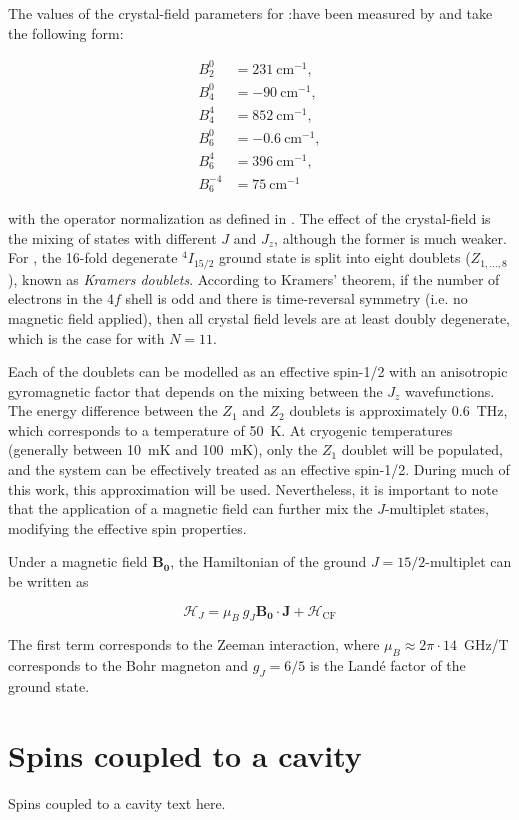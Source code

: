 The values of the crystal-field parameters for \Er:\Ca have been measured by \cite{enrique_optical_1971} and take the following form:

\begin{align*}
    B_2^0 &= 231~\text{cm}^{-1}, \\
    B_4^0 &= -90~\text{cm}^{-1}, \\
    B_4^4 &= 852~\text{cm}^{-1}, \\
    B_6^0 &= -0.6~\text{cm}^{-1}, \\
    B_6^4 &= 396~\text{cm}^{-1}, \\
    B_6^{-4} &= 75~\text{cm}^{-1}
\end{align*}

with the operator normalization as defined in \cite{erath_crystal_1961}. The effect of the crystal-field is the mixing of states with different $J$ and $J_z$, although the former is much weaker. For \Er, the 16-fold degenerate $^4I_{15/2}$ ground state is split into eight doublets ($Z_{1,\dots,8}$), known as \emph{Kramers doublets}. According to Kramers' theorem, \cite{kramers_general_1930} if the number of electrons in the $4f$ shell is odd and there is time-reversal symmetry (i.e. no magnetic field applied), then all crystal field levels are at least doubly degenerate, which is the case for \Er with $N=11$.

Each of the doublets can be modelled as an effective spin-1/2 with an anisotropic gyromagnetic factor that depends on the mixing between the $J_z$ wavefunctions. The energy difference between the $Z_1$ and $Z_2$ doublets is approximately 0.6~THz, which corresponds to a temperature of 50~K. At cryogenic temperatures (generally between 10~mK and 100~mK), only the $Z_1$ doublet will be populated, and the system can be effectively treated as an effective spin-1/2. During much of this work, this approximation will be used. Nevertheless, it is important to note that the application of a magnetic field can further mix the $J$-multiplet states, modifying the effective spin properties.

Under a magnetic field $\mathbf{B_0}$, the Hamiltonian of the ground $J=15/2$-multiplet can be written as 

\begin{equation}
    \mathcal{H}_J = \mu_B \ g_J\mathbf{B_0}\cdot \mathbf{J} + \mathcal{H}_{\mathrm{CF}}
\end{equation}

The first term corresponds to the Zeeman interaction, where $\mu_B\approx2\pi\cdot14$~GHz/T corresponds to the Bohr magneton and $g_J=6/5$ is the Landé factor of the \Er ground state.

\section{Spins coupled to a cavity}
Spins coupled to a cavity text here.